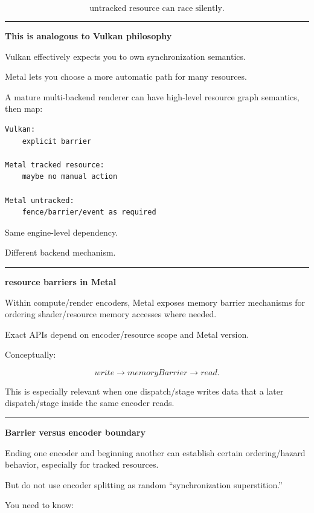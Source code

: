 \[
\boxed{
\text{untracked resource can race silently}.
}
\]

\begin{center}\rule{0.5\linewidth}{0.5pt}\end{center}

\textbf{This is analogous to Vulkan philosophy}

Vulkan effectively expects you to own synchronization semantics.

Metal lets you choose a more automatic path for many resources.

A mature multi-backend renderer can have high-level resource graph semantics, then map:

\begin{verbatim}
Vulkan:
    explicit barrier

Metal tracked resource:
    maybe no manual action

Metal untracked:
    fence/barrier/event as required
\end{verbatim}

Same engine-level dependency.

Different backend mechanism.

\begin{center}\rule{0.5\linewidth}{0.5pt}\end{center}

\textbf{resource barriers in Metal}

Within compute/render encoders, Metal exposes memory barrier mechanisms for ordering shader/resource memory accesses where needed.

Exact APIs depend on encoder/resource scope and Metal version.

Conceptually:

\[
write
\rightarrow
memoryBarrier
\rightarrow
read.
\]

This is especially relevant when one dispatch/stage writes data that a later dispatch/stage inside the same encoder reads.

\begin{center}\rule{0.5\linewidth}{0.5pt}\end{center}

\textbf{Barrier versus encoder boundary}

Ending one encoder and beginning another can establish certain ordering/hazard behavior, especially for tracked resources.

But do not use encoder splitting as random ``synchronization superstition.''

You need to know:

